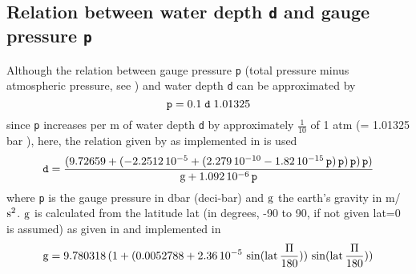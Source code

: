 \documentclass[a4paper]{article}
\begin{document}
\subsection{Relation between water depth \texttt{d} and gauge pressure \texttt{p}}
Although the relation between gauge pressure \texttt{p} (total pressure minus atmospheric pressure, see \cite{Feistel2008})  and water depth \texttt{d} can be approximated by 
\begin{equation}
 \rm \mbox{\texttt{p}} = 0.1\;\mbox{\texttt{d}}\;1.01325
\end{equation}
since \texttt{p} increases per m of water depth \texttt{d} by approximately $\frac{1}{10}$ of 1 atm (= 1.01325 bar \citet[chap. 5, p. 3]{Dickson2007}),
here, the relation given by \cite{Fofonoff1983} as implemented in \cite{marelac} is used
\begin{equation}
\rm \mbox{\texttt{d}} = \frac{(9.72659 + (-2.2512\,10^{-5} + (2.279\,10^{-10} - 1.82\,10^{-15} \, \mbox{\texttt{p}}) \, \mbox{\texttt{p}})\, \mbox{\texttt{p}})\, \mbox{\texttt{p}})}{g + 1.092\,10^{-6} \, \mbox{\texttt{p}}}
\end{equation}
where \mbox{\texttt{p}} is the gauge pressure in dbar (deci-bar) and $\rm g$ the earth's gravity in m/$\rm s^2$. $\rm g$ is calculated from the latitude lat (in degrees, -90 to 90, if not given lat=0 is assumed) as given in \cite{Fofonoff1983}
and implemented in \cite{marelac}
\begin{equation}
\rm g = 9.780318\, (1+ ( 0.0052788 + 2.36\,10^{-5}\,\sin(lat\,\frac{\Pi}{180}))\,\sin(lat\,\frac{\Pi}{180}))
\end{equation}
\end{document}
